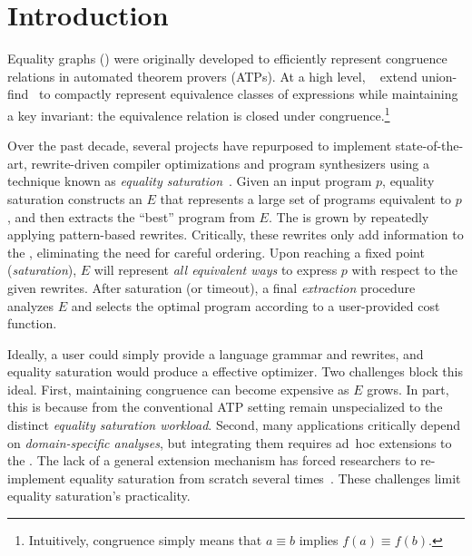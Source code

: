 \chapter{Introduction}
\label{sec:intro}

Equality graphs (\egraphs) were originally developed to
  efficiently represent congruence relations
  in automated theorem provers (ATPs).
At a high level, \egraphs~\cite{nelson, pp-congr}
  extend union-find~\cite{unionfind} to compactly represent
  equivalence classes of expressions while
  maintaining a key invariant:
  the equivalence relation is closed under congruence.\footnote{
    Intuitively, congruence simply means
    that $a \equiv b$ implies $f(a) \equiv f(b)$.}

Over the past decade, several projects have repurposed \egraphs
  to implement state-of-the-art, rewrite-driven
  compiler optimizations and program synthesizers
  using a technique known as \textit{equality saturation}~\cite{
    denali, eqsat, eqsat-llvm, szalinski, yogo-pldi20, spores, herbie}.
Given an input program $p$,
  equality saturation constructs an \egraph $E$ that
  represents a large set of programs equivalent to $p$,
  and then extracts the ``best'' program from $E$.
The \egraph is grown by repeatedly applying
  pattern-based rewrites. %
Critically, these rewrites only add information to the \egraph,
  eliminating the need for careful ordering.
Upon reaching a fixed point (\textit{saturation}),
  $E$ will represent \textit{all equivalent ways} to
  express $p$ with respect to the given rewrites.
After saturation (or timeout),
  a final \textit{extraction} procedure
  analyzes $E$ and selects the
  optimal program according to
  a user-provided cost function.

Ideally, a user could simply provide
  a language grammar and rewrites,
  and equality saturation would produce a effective optimizer.
Two challenges block this ideal.
First, maintaining congruence can become expensive as $E$ grows.
In part, this is because \egraphs from the conventional ATP setting
  remain unspecialized to the distinct \textit{equality saturation workload}.
Second, many applications critically depend on
  \textit{domain-specific analyses}, but
  integrating them requires ad~hoc extensions to the \egraph.
The lack of a general extension mechanism
  has forced researchers to re-implement
  equality saturation from scratch several times~\cite{herbie, eqsat, wu_siga19}.
These challenges limit equality saturation's practicality.


